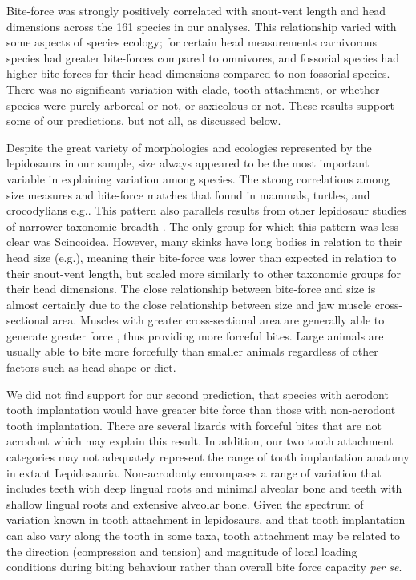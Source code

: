 \documentclass[a4paper, 12pt]{article}
\begin{document}
Bite-force was strongly positively correlated with snout-vent length and head dimensions across the 161 species in our analyses. 
This relationship varied with some aspects of species ecology; for certain head measurements carnivorous species had greater bite-forces compared to omnivores, and fossorial species had higher bite-forces for their head dimensions compared to non-fossorial species. 
There was no significant variation with clade, tooth attachment, or whether species were purely arboreal or not, or saxicolous or not. 
These results support some of our predictions, but not all, as discussed below.

Despite the great variety of morphologies and ecologies represented by the lepidosaurs in our sample, size always appeared to be the most important variable in explaining variation among species. 
The strong correlations among size measures and bite-force matches that found in mammals, turtles, and crocodylians e.g.\cite{aguirre2002ecomorphological,marshall2012ontogenetic,becerra2013biting,erickson2014comparative}.
This pattern also parallels results from other lepidosaur studies of narrower taxonomic breadth \cite{lailvaux2004performance,vanhooydonck2005does,MEASEY2009217,jones2020reproductive}.
The only group for which this pattern was less clear was Scincoidea. 
However, many skinks have long bodies in relation to their head size (e.g.\cite{wiens2006does}), meaning their bite-force was lower than expected in relation to their snout-vent length, but scaled more similarly to other taxonomic groups for their head dimensions. 
The close relationship between bite-force and size is almost certainly due to the close relationship between size and jaw muscle cross-sectional area. 
Muscles with greater cross-sectional area are generally able to generate greater force \cite{groning2013importance,sellers2017ontogeny}, thus providing more forceful bites. 
Large animals are usually able to bite more forcefully than smaller animals regardless of other factors such as head shape or diet. 

We did not find support for our second prediction, that species with acrodont tooth implantation would have greater bite force than those with non-acrodont tooth implantation. 
There are several lizards with forceful bites that are not acrodont which may explain this result. 
In addition, our two tooth attachment categories may not adequately represent the range of tooth implantation anatomy in extant Lepidosauria. Non-acrodonty encompases a range of variation that includes teeth with deep lingual roots and minimal alveolar bone and teeth with shallow lingual roots and extensive alveolar bone\cite{smith1958evolutionary,presch1974,berkovitz2017}. 
Given the spectrum of variation known in tooth attachment in lepidosaurs\cite{bertin2018current}, and that tooth implantation can also vary along the tooth in some taxa, tooth attachment may be related to the direction (compression and tension) and magnitude of local loading conditions during biting behaviour rather than overall bite force capacity \textit{per se}. 
 
\end{document}
